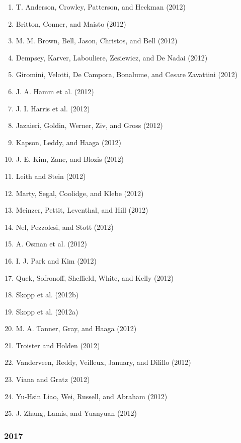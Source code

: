 \documentclass[english,man]{apa6}
\providecommand{\tightlist}{%
  \setlength{\itemsep}{0pt}\setlength{\parskip}{0pt}}
\theoremstyle{definition}
\theoremstyle{definition}
\theoremstyle{definition}
\theoremstyle{remark}
\begin{document}
\begin{enumerate}
\def\labelenumi{\arabic{enumi})}
\tightlist
\item
  T. Anderson, Crowley, Patterson, and Heckman (2012)
\item
  Britton, Conner, and Maisto (2012)
\item
  M. M. Brown, Bell, Jason, Christos, and Bell (2012)
\item
  Dempsey, Karver, Labouliere, Zesiewicz, and De Nadai (2012)
\item
  Giromini, Velotti, De Campora, Bonalume, and Cesare Zavattini (2012)
\item
  J. A. Hamm et al. (2012)
\item
  J. I. Harris et al. (2012)
\item
  Jazaieri, Goldin, Werner, Ziv, and Gross (2012)
\item
  Kapson, Leddy, and Haaga (2012)
\item
  J. E. Kim, Zane, and Blozis (2012)
\item
  Leith and Stein (2012)
\item
  Marty, Segal, Coolidge, and Klebe (2012)
\item
  Meinzer, Pettit, Leventhal, and Hill (2012)
\item
  Nel, Pezzolesi, and Stott (2012)
\item
  A. Osman et al. (2012)
\item
  I. J. Park and Kim (2012)
\item
  Quek, Sofronoff, Sheffield, White, and Kelly (2012)
\item
  Skopp et al. (2012b)
\item
  Skopp et al. (2012a)
\item
  M. A. Tanner, Gray, and Haaga (2012)
\item
  Troister and Holden (2012)
\item
  Vanderveen, Reddy, Veilleux, January, and Dilillo (2012)
\item
  Viana and Gratz (2012)
\item
  Yu-Hsin Liao, Wei, Russell, and Abraham (2012)
\item
  J. Zhang, Lamis, and Yuanyuan (2012)
\end{enumerate}

\subsubsection{2017}\label{section-1}
\end{document}
